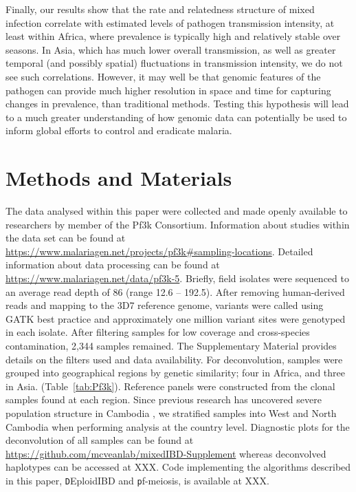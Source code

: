 \documentclass[9pt,lineno]{elife}
\begin{document}
Finally, our results show that the rate and relatedness structure of mixed infection correlate with estimated levels of pathogen transmission intensity, at least within Africa, where prevalence is typically high and relatively stable over seasons.  In Asia, which has much lower overall transmission, as well as greater temporal (and possibly spatial) fluctuations in transmission intensity, we do not see such correlations.  However, it may well be that genomic features of the pathogen can provide much higher resolution in space and time for capturing changes in prevalence, than traditional methods.  Testing this hypothesis will lead to a much greater understanding of how genomic data can potentially be used  to inform global efforts to control and eradicate malaria.


\section{Methods and Materials}

The data analysed within this paper were collected and made openly available to researchers by member of the Pf3k Consortium.  Information about studies within the data set can be found at \url{https://www.malariagen.net/projects/pf3k#sampling-locations}.  Detailed information about data processing can be found at \url{https://www.malariagen.net/data/pf3k-5}.  Briefly, field isolates were sequenced to an average read depth of 86 (range 12.6 -- 192.5).  After removing human-derived reads and mapping to the 3D7 reference genome, variants were called using GATK best practice and approximately one million variant sites were genotyped in each isolate. After filtering samples for low coverage and cross-species contamination, 2,344 samples remained.    The Supplementary Material provides details on the filters used and data availability. For deconvolution, samples were grouped into geographical regions by genetic similarity; four in Africa, and three in Asia. (Table~\ref{tab:Pf3k}). Reference panels were constructed from the clonal samples found at each region. Since previous research has uncovered severe population structure in Cambodia \citep{Miotto2013}, we stratified samples into West and North Cambodia when performing analysis at the country level. Diagnostic plots for the deconvolution of all samples can be found at \url{https://github.com/mcveanlab/mixedIBD-Supplement} whereas deconvolved haplotypes can be accessed at XXX.  Code implementing the algorithms described in this paper, {\texttt DEploidIBD} and {\texttt pf-meiosis}, is available at XXX.
\end{document}
